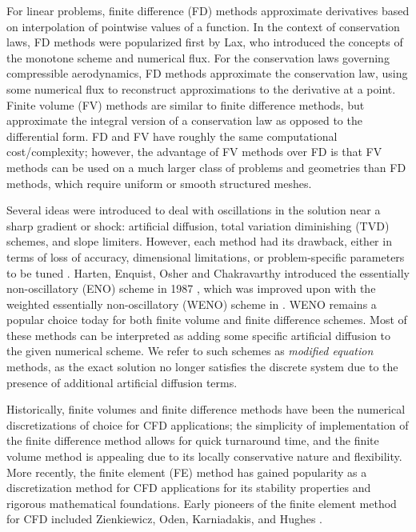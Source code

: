 For linear problems, finite difference (FD) methods approximate derivatives based on interpolation of pointwise values of a function.  In the context of conservation laws, FD methods were popularized first by Lax, who introduced the concepts of the monotone scheme and numerical flux. For the conservation laws governing compressible aerodynamics, FD methods approximate the conservation law, using some numerical flux to reconstruct approximations to the derivative at a point. Finite volume (FV) methods are similar to finite difference methods, but approximate the integral version of a conservation law as opposed to the differential form. FD and FV have roughly the same computational cost/complexity; however, the advantage of FV methods over FD is that FV methods can be used on a much larger class of problems and geometries than FD methods, which require uniform or smooth structured meshes. 

Several ideas were introduced to deal with oscillations in the solution near a sharp gradient or shock: artificial diffusion, total variation diminishing (TVD) schemes, and slope limiters. However, each method had its drawback, either in terms of loss of accuracy, dimensional limitations, or problem-specific parameters to be tuned \cite{Shu:Lectures}. Harten, Enquist, Osher and Chakravarthy introduced the essentially non-oscillatory (ENO) scheme in 1987 \cite{ENO}, which was improved upon with the weighted essentially non-oscillatory (WENO) scheme in \cite{WENO}. WENO remains a popular choice today for both finite volume and finite difference schemes. Most of these methods can be interpreted as adding some specific artificial diffusion to the given numerical scheme.  We refer to such schemes as \emph{modified equation} methods, as the exact solution no longer satisfies the discrete system due to the presence of additional artificial diffusion terms.  

Historically, finite volumes and finite difference methods have been the numerical discretizations of choice for CFD applications; the simplicity of implementation of the finite difference method allows for quick turnaround time, and the finite volume method is appealing due to its locally conservative nature and flexibility. More recently, the finite element (FE) method has gained popularity as a discretization method for CFD applications for its stability properties and rigorous mathematical foundations. Early pioneers of the finite element method for CFD included Zienkiewicz, Oden, Karniadakis, and Hughes \cite{ChungCFDBook}.  

